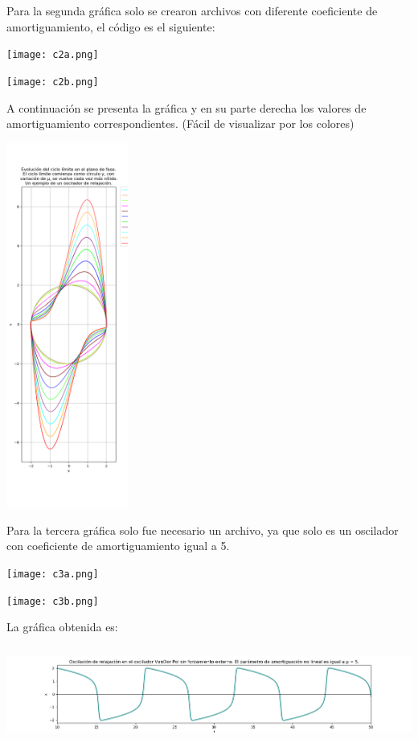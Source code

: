 \documentclass[12pt]{article}
\begin{document}
Para la segunda gráfica solo se crearon archivos con diferente coeficiente de amortiguamiento, el código es el siguiente:
\begin{center}
    \texttt{[image: c2a.png]}\\
\end{center}
\begin{center}
    \texttt{[image: c2b.png]}\\
\end{center}

A continuación se presenta la gráfica y en su parte derecha los valores de amortiguamiento correspondientes. (Fácil de visualizar por los colores)
\begin{center}
    \includegraphics[height=12cm]{Producto2.png}\\
\end{center}
Para la tercera gráfica solo fue necesario un archivo, ya que solo es un oscilador con coeficiente de amortiguamiento igual a 5.
\begin{center}
    \texttt{[image: c3a.png]}\\
\end{center}
\begin{center}
    \texttt{[image: c3b.png]}\\
\end{center}
La gráfica obtenida es:
\begin{center}
    \includegraphics[height=3.15cm]{Producto3.png}\\
\end{center}
\end{document}
